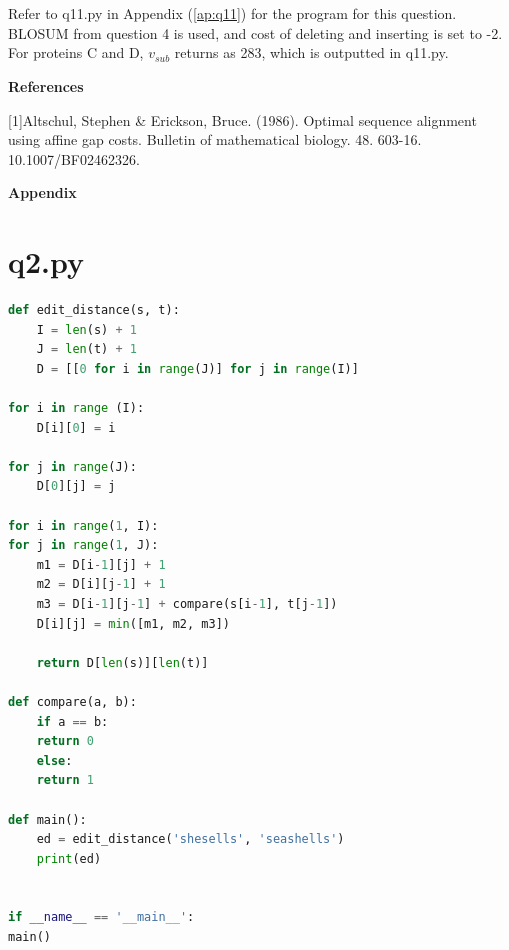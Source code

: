 \documentclass{article}
\begin{document}
	\section{}
	Refer to q11.py in Appendix (\ref{ap:q11}) for the program for this question.
	BLOSUM from question 4 is used, and cost of deleting and inserting is set to -2. 
	For proteins C and D, $ v_{sub} $ returns as 283, which is outputted in q11.py.
	
	\newpage
	\begin{center}\LARGE\bf
		References
	\end{center}
	[1]Altschul, Stephen \& Erickson, Bruce. (1986). Optimal sequence alignment using affine gap costs. Bulletin of mathematical biology. 48. 603-16. 10.1007/BF02462326. 
	
	\newpage
	
	\appendix
	\centering\textbf{\huge Appendix}
	\section{q2.py}
	\label{ap:q2}
	\begin{lstlisting}[language = python]
def edit_distance(s, t):
	I = len(s) + 1
	J = len(t) + 1
	D = [[0 for i in range(J)] for j in range(I)]

for i in range (I):
	D[i][0] = i

for j in range(J):
	D[0][j] = j

for i in range(1, I):
for j in range(1, J):
	m1 = D[i-1][j] + 1
	m2 = D[i][j-1] + 1
	m3 = D[i-1][j-1] + compare(s[i-1], t[j-1])
	D[i][j] = min([m1, m2, m3])
	
	return D[len(s)][len(t)]

def compare(a, b):
	if a == b:
	return 0
	else:
	return 1

def main():
	ed = edit_distance('shesells', 'seashells')
	print(ed)


if __name__ == '__main__':
main()
	\end{lstlisting}
\end{document}
